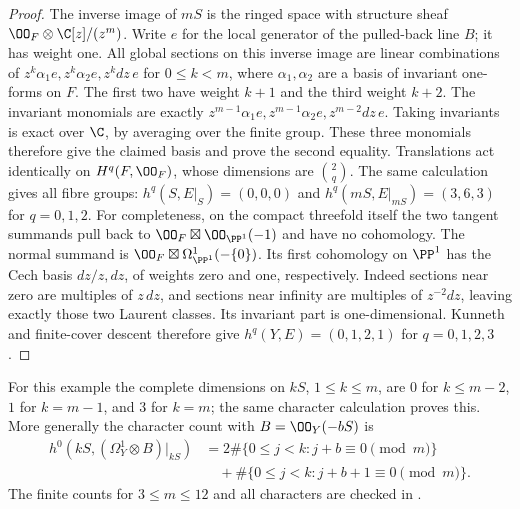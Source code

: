 \begin{proof}
The inverse image of $mS$ is the ringed space with structure sheaf $\OO_F\otimes\C[z]/(z^m)$. Write $e$ for the local generator of the pulled-back line $B$; it has weight one. All global sections on this inverse image are linear combinations of $z^k\alpha_1e,z^k\alpha_2e,z^kdz\,e$ for $0\le k<m$, where $\alpha_1,\alpha_2$ are a basis of invariant one-forms on $F$. The first two have weight $k+1$ and the third weight $k+2$. The invariant monomials are exactly
$z^{m-1}\alpha_1e,z^{m-1}\alpha_2e,z^{m-2}dz\,e$.
Taking invariants is exact over $\C$, by averaging over the finite group. These three monomials therefore give the claimed basis and prove the second equality. Translations act identically on $H^q(F,\OO_F)$, whose dimensions are $\binom{2}{q}$. The same calculation gives all fibre groups: $h^q(S,E|_S)=(0,0,0)$ and $h^q(mS,E|_{mS})=(3,6,3)$ for $q=0,1,2$. For completeness, on the compact threefold itself the two tangent summands pull back to $\OO_F\boxtimes\OO_{\PP^1}(-1)$ and have no cohomology. The normal summand is $\OO_F\boxtimes\Omega^1_{\PP^1}(-\{0\})$. Its first cohomology on $\PP^1$ has the Cech basis $dz/z,dz$, of weights zero and one, respectively. Indeed sections near zero are multiples of $z\,dz$, and sections near infinity are multiples of $z^{-2}dz$, leaving exactly those two Laurent classes. Its invariant part is one-dimensional. Kunneth and finite-cover descent therefore give $h^q(Y,E)=(0,1,2,1)$ for $q=0,1,2,3$.
\end{proof}

For this example the complete dimensions on $kS$, $1\le k\le m$, are $0$ for $k\le m-2$, $1$ for $k=m-1$, and $3$ for $k=m$; the same character calculation proves this. More generally the character count with $B=\OO_Y(-bS)$ is
\[
\begin{aligned}
h^0(kS,(\Omega_Y^1\otimes B)|_{kS})
&=2\#\{0\le j<k:j+b\equiv0\pmod m\}\\
&\quad+\#\{0\le j<k:j+b+1\equiv0\pmod m\}.
\end{aligned}
\tag{A.13}
\]
The finite counts for $3\le m\le12$ and all characters are checked in .

